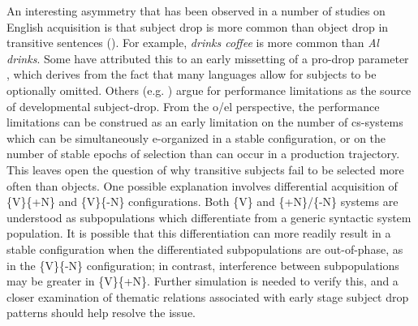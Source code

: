   An interesting asymmetry that has been observed in a number of studies on English acquisition is that subject drop is more common than object drop in transitive sentences (\citealt{PBloom1990,Valian1991}). For example, \textit{drinks coffee} is more common than \textit{Al drinks}. Some have attributed this to an early missetting of a pro-drop parameter \citep{Hyams2012}, which derives from the fact that many languages allow for subjects to be optionally omitted. Others (e.g. \citealt{PBloom1990}) argue for performance limitations as the source of developmental subject-drop. From the o/el perspective, the performance limitations can be construed as an early limitation on the number of cs-systems which can be simultaneously e-organized in a stable configuration, or on the number of stable epochs of selection than can occur in a production trajectory. This leaves open the question of why transitive subjects fail to be selected more often than objects. One possible explanation involves differential acquisition of \{V\}\{+N\} and \{V\}\{-N\} configurations. Both \{V\} and \{+N\}/\{-N\} systems are understood as subpopulations which differentiate from a generic syntactic system population. It is possible that this differentiation can more readily result in a stable configuration when the differentiated subpopulations are out-of-phase, as in the \{V\}\{-N\} configuration; in contrast, interference between subpopulations may be greater in \{V\}\{+N\}. Further simulation is needed to verify this, and a closer examination of thematic relations associated with early stage subject drop patterns should help resolve the issue.

